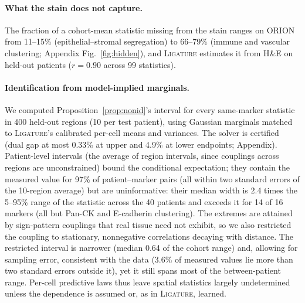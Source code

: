 \documentclass[10pt,letterpaper]{article}
\theoremstyle{definition}
\theoremstyle{remark}
\newcommand{\method}{\textnormal{\textsc{Ligature}}}
\begin{document}
\paragraph{What the stain does not capture.} The fraction of a cohort-mean statistic missing from the stain ranges on ORION from 11--15\% (epithelial--stromal segregation) to 66--79\% (immune and vascular clustering; Appendix Fig.~\ref{fig:hidden}), and \method{} estimates it from H\&E on held-out patients ($r=0.90$ across 99 statistics).

\paragraph{Identification from model-implied marginals.}
We computed Proposition~\ref{prop:nonid}'s interval for every same-marker statistic in 400 held-out regions (10 per test patient), using Gaussian marginals matched to \method{}'s calibrated per-cell means and variances. The solver is certified (dual gap at most 0.33\% at upper and 4.9\% at lower endpoints; Appendix). Patient-level intervals (the average of region intervals, since couplings across regions are unconstrained) bound the conditional expectation; they contain the measured value for 97\% of patient--marker pairs (all within two standard errors of the 10-region average) but are uninformative: their median width is 2.4 times the 5--95\% range of the statistic across the 40 patients and exceeds it for 14 of 16 markers (all but Pan-CK and E-cadherin clustering). The extremes are attained by sign-pattern couplings that real tissue need not exhibit, so we also restricted the coupling to stationary, nonnegative correlations decaying with distance. The restricted interval is narrower (median 0.64 of the cohort range) and, allowing for sampling error, consistent with the data (3.6\% of measured values lie more than two standard errors outside it), yet it still spans most of the between-patient range. Per-cell predictive laws thus leave spatial statistics largely undetermined unless the dependence is assumed or, as in \method{}, learned.


\begin{table}[htp]
\centering
\caption{Per-marker identification intervals for clustering statistics (patient level). Cohort range: 5--95\% range of the measured statistic across patients. Per-cell interval: width of Proposition~\ref{prop:nonid}'s interval from calibrated per-cell laws; restricted: stationary, nonnegative, decaying correlations. Ratios are to the cohort range.}
\label{tab:ident}
\normalsize

\end{table}
\end{document}
